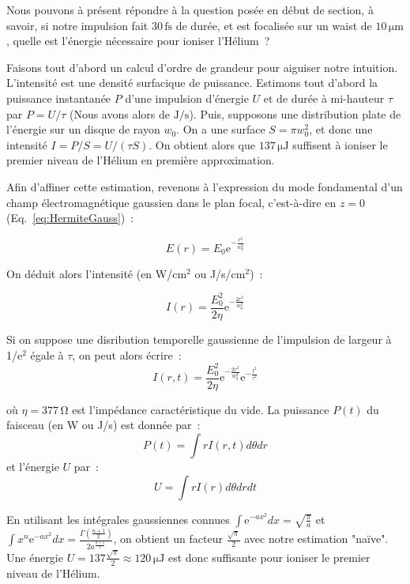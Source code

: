 \documentclass[a4paper]{book}
\begin{document}
Nous pouvons à présent répondre à la question posée en début de section, à savoir, si notre impulsion fait $30\,\mathrm{fs}$ de durée, et est focalisée sur un waist de $10\,\mathrm{\mu m}$, quelle est l'énergie nécessaire pour ioniser l'Hélium~?

Faisons tout d'abord un calcul d'ordre de grandeur pour aiguiser notre intuition. L'intensité est une densité surfacique de puissance. Estimons tout d'abord la puissance instantanée $P$ d'une impulsion d'énergie $U$ et de durée à mi-hauteur $\tau$ par $P = U/\tau$ (Nous avons alors de $\mathrm{J/s}$). Puis, supposons une distribution plate de l'énergie sur un disque de rayon $w_0$. On a une surface $S=\pi w_0^2$, et donc une intensité $I = P/S = U/(\tau S)$. On obtient alors que $137\,\mathrm{\mu J}$ suffisent à ioniser le premier niveau de l'Hélium en première approximation. 

Afin d'affiner cette estimation, revenons à l'expression du mode fondamental d'un champ électromagnétique gaussien dans le plan focal, c'est-à-dire en $z=0$ (Eq.~\ref{eq:HermiteGauss})~:

\begin{equation}
    E(r)=E_0\mathrm{e}^{-\frac{r^2}{w_0^2}}
\end{equation}

On déduit alors l'intensité (en W/cm$^2$ ou J/s/cm$^2$)~:

\begin{equation}
    I(r)=\frac{E_0^2}{2\eta}\mathrm{e}^{-\frac{2r^2}{w_0^2}}
\end{equation}

Si on suppose une disribution temporelle gaussienne de l'impulsion de largeur à 1/e$^2$ égale à $\tau$, on peut alors écrire~:
\begin{equation}
    I(r, t)=\frac{E_0^2}{2\eta}\mathrm{e}^{-\frac{2r^2}{w_0^2}}\mathrm{e}^{-\frac{t^2}{\tau^2}}
\end{equation}

où $\eta = 377\,\mathrm{\Omega}$ est l'impédance caractéristique du vide. La puissance $P(t)$ du faisceau (en W ou J/s) est donnée par~: 
\begin{equation}
    P(t)=\int  r I(r, t)d\theta dr
\end{equation}
et l'énergie $U$ par~:
\begin{equation}
    U=\int  r I(r)d\theta dr dt
\end{equation}

En utilisant les intégrales gaussiennes connues $\int \mathrm{e}^{-ax^2} dx = \sqrt{\frac{\pi}{a}}$ et $\int x^n\mathrm{e}^{-ax^2} dx = \frac{\Gamma(\frac{n+1}{2})}{2a^{\frac{n+1}{2}}}$, on obtient un facteur $\frac{\sqrt{\pi}}{2}$ avec notre estimation "naïve". Une énergie $U = 137\frac{\sqrt{\pi}}{2}\approx 120\,\mathrm{\mu J}$ est donc suffisante pour ioniser le premier niveau de l'Hélium. 
\end{document}
